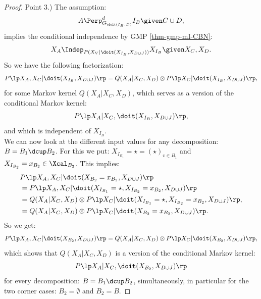 \begin{Cor}[Do-calculus]
\begin{proof}
Point 3.) The assumption:
            \[ A \Perp^d_{G_{\doit(I_B,D)}} I_B \given C  \cup D,   \]
implies the conditional independence by GMP \ref{thm-gmp-mI-CBN}:
\[ X_A \Indep_{P(X_V|\doit(X_{I_B},X_{D\cup J}))} X_{I_B} \given X_C,X_D.\]
So we have the following factorization:
\[ P\lp X_A,X_C|\doit(X_{I_B},X_{D\cup J})\rp = Q(X_A|X_C,X_D) \otimes P\lp X_C|\doit(X_{I_B},X_{D\cup J})\rp,\]
for some Markov kernel $Q(X_A|X_C,X_D)$, which serves as a version of the conditional Markov kernel:
\[P\lp X_A|X_C,\doit(X_{I_B},X_{D\cup J})\rp,\]
and which is independent of $X_{I_B}$.\\ 
We can now look at the different input values for any decomposition: $B=B_1 \dcup B_2$.
For this we put: $X_{I_{B_1}}= \star = (\star)_{v \in B_1}$ and  $ X_{I_{B_2}}=x_{B_2} \in \Xcal_{B_2}$.
This implies:
\begin{align*} 
  & P\lp X_A,X_C|\doit(X_{{B_2}}=x_{B_2},X_{D\cup J})\rp \\
  &= P\lp X_A,X_C|\doit(X_{I_{B_1}}=\star,X_{I_{B_2}}=x_{B_2},X_{D\cup J})\rp \\
  &= Q(X_A|X_C,X_D) \otimes P\lp X_C|\doit(X_{I_{B_1}}=\star,X_{I_{B_2}}=x_{B_2},X_{D\cup J})\rp,\\
  &= Q(X_A|X_C,X_D) \otimes P\lp X_C|\doit(X_{{B_2}}=x_{B_2},X_{D\cup J})\rp.
\end{align*}
So we get:
\[P\lp X_A,X_C|\doit(X_{B_2},X_{D\cup J})\rp 
= Q(X_A|X_C,X_D) \otimes P\lp X_C|\doit(X_{B_2},X_{D\cup J})\rp,\]
which shows that $Q(X_A|X_C,X_D)$ is a version of the conditional Markov kernel:
\[P\lp X_A|X_C,\doit(X_{B_2},X_{D\cup J})\rp \]
for every decomposition: $B = B_1 \dcup B_2$, simultaneously, in particular for the two corner cases:
$B_2 = \emptyset$ and $B_2 = B$.



\end{proof}
\end{Cor}
